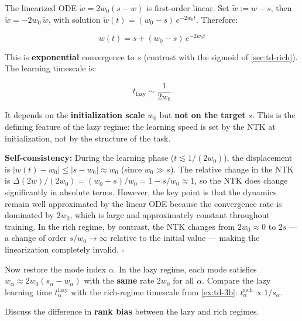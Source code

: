 \documentclass[11pt]{article}
\begin{document}
\begin{solution}[ex:td-4b]
The linearized ODE \(\dot{w} = 2w_0(s - w)\) is first-order
linear. Set \(\tilde{w} := w - s\), then
\(\dot{\tilde{w}} = -2w_0\,\tilde{w}\), with solution
\(\tilde{w}(t) = (w_0 - s)\,e^{-2w_0 t}\). Therefore:

\[\boxed{w(t) = s + (w_0 - s)\,e^{-2w_0 t}}\]

This is \textbf{exponential} convergence to \(s\) (contrast with the
sigmoid of \cref{sec:td-rich}). The learning timescale is:

\[t_{\text{lazy}} \sim \frac{1}{2w_0}\]

It depends on the \textbf{initialization scale} \(w_0\) but \textbf{not
on the target} \(s\). This is the defining feature of the lazy regime:
the learning speed is set by the NTK at initialization, not by the
structure of the task.

\textbf{Self-consistency:} During the learning phase
(\(t \lesssim 1/(2w_0)\)), the displacement is
\(|w(t) - w_0| \leq |s - w_0| \approx w_0\) (since \(w_0 \gg s\)). The
relative change in the NTK is
\(\Delta(2w)/(2w_0) = (w_0 - s)/w_0 = 1 - s/w_0 \approx 1\), so the NTK
does change significantly in absolute terms. However, the key point is
that the dynamics remain well approximated by the linear ODE because the
convergence rate is dominated by \(2w_0\), which is large and
approximately constant throughout training. In the rich regime, by
contrast, the NTK changes from \(2w_0 \approx 0\) to \(2s\) --- a change
of order \(s/w_0 \to \infty\) relative to the initial value --- making
the linearization completely invalid. \(\square\)
\end{solution}

\begin{exercise}
\label{ex:td-4c}
Now restore the mode
index \(\alpha\). In the lazy regime, each mode satisfies
\(\dot{w}_\alpha \approx 2w_0(s_\alpha - w_\alpha)\) with the
\textbf{same} rate \(2w_0\) for all \(\alpha\). Compare the lazy
learning time \(t_\alpha^{\text{lazy}}\) with the rich-regime timescale
from \cref{ex:td-3b}: \(t_\alpha^{\text{rich}} \propto 1/s_\alpha\).

Discuss the difference in \textbf{rank bias} between the lazy and rich
regimes.
\end{exercise}
\end{document}
